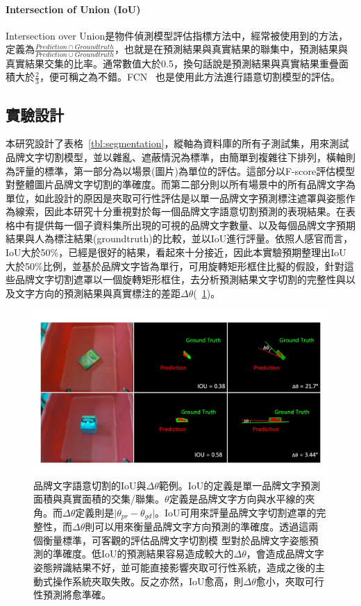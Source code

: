 \paragraph{Intersection of Union (IoU)}
Intersection over Union是物件偵測模型評估指標方法中，經常被使用到的方法，定義為$\frac{Prediction \cap  Groundtruth}{Prediction \cup  Groundtruth}$，也就是在預測結果與真實結果的聯集中，預測結果與真實結果交集的比率。通常數值大於0.5，換句話說是預測結果與真實結果重疊面積大於$\frac{2}{3}$，便可稱之為不錯。FCN ~\cite{long2015fully}也是使用此方法進行語意切割模型的評估。

\subsection{實驗設計}

本研究設計了表格~\ref{tbl:segmentation}，縱軸為資料庫的所有子測試集，用來測試品牌文字切割模型，並以雜亂、遮蔽情況為標準，由簡單到複雜往下排列，橫軸則為評量的標準，第一部分為以場景(圖片)為單位的評估。這部分以F-score評估模型對整體圖片品牌文字切割的準確度。而第二部分則以所有場景中的所有品牌文字為單位，如此設計的原因是夾取可行性評估是以單一品牌文字預測標注遮罩與姿態作為線索，因此本研究十分重視對於每一個品牌文字語意切割預測的表現結果。在表格中有提供每一個子資料集所出現的可視的品牌文字數量、以及每個品牌文字預期結果與人為標注結果(groundtruth)的比較，並以IoU進行評量。依照人感官而言，IoU大於50\%，已經是很好的結果，看起來十分接近，因此本實驗預期整理出IoU大於50\%比例，並基於品牌文字皆為單行，可用旋轉矩形框住比擬的假設，針對這些品牌文字切割遮罩以一個旋轉矩形框住，去分析預測結果文字切割的完整性與以及文字方向的預測結果與真實標注的差距$\Delta\theta$(~\ref{figure:iou_deltatheta})。

\begin{figure}[H]
	\centering
	\includegraphics[height=!, width=1.0\linewidth, keepaspectratio=true]
	{./figures/iou_deltatheta.jpg}
  \caption{品牌文字語意切割的IoU與$\Delta\theta$範例。IoU的定義是單一品牌文字預測面積與真實面積的交集/聯集。$\theta$定義是品牌文字方向與水平線的夾角。而$\Delta\theta$定義則是$\lvert\theta_{pr}-\theta_{gd}\rvert$。IoU可用來評量品牌文字切割遮罩的完整性，而$\Delta\theta$則可以用來衡量品牌文字方向預測的準確度。透過這兩個衡量標準，可客觀的評估品牌文字切割模
型對於品牌文字姿態預測的準確度。低IoU的預測結果容易造成較大的$\Delta\theta$，會造成品牌文字姿態辨識結果不好，並可能直接影響夾取可行性系統，造成之後的主動式操作系統夾取失敗。反之亦然，IoU愈高，則$\Delta\theta$愈小，夾取可行性預測將愈準確。}
  \label{figure:iou_deltatheta}
\end{figure}

